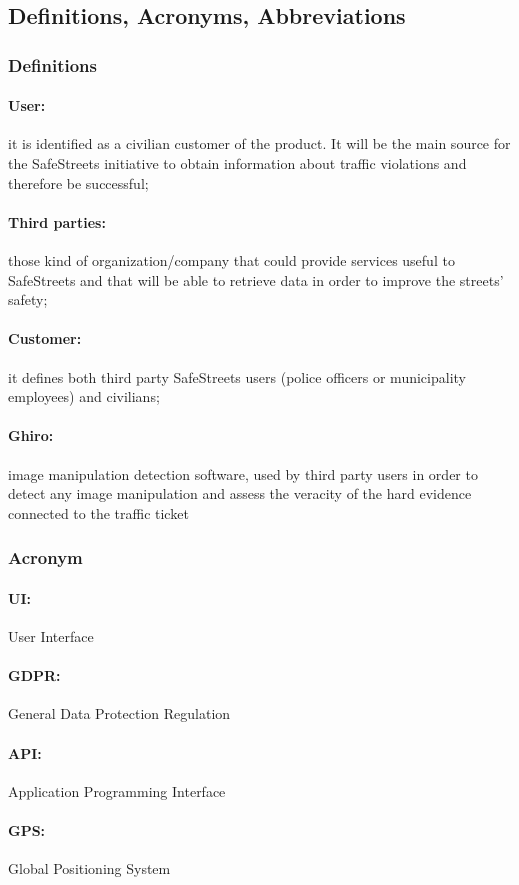 \documentclass{article}
\begin{document}
\subsection{Definitions, Acronyms, Abbreviations}
\subsubsection{Definitions}
\paragraph{User:} it is identified as a civilian customer of the product. It
will be the main source for the SafeStreets initiative to obtain information
about traffic violations and therefore be successful; \paragraph{Third
parties:}those kind of organization/company that could provide services useful
to SafeStreets and that will be able to retrieve data in order to improve the
streets' safety; \paragraph{Customer:} it defines both third party SafeStreets
users (police officers or municipality employees) and civilians;
\paragraph{Ghiro:} image manipulation detection software, used by third party
users in order to detect any image manipulation and assess the veracity of the
hard evidence connected to the traffic ticket
\subsubsection{Acronym}
\paragraph{UI:} User Interface \paragraph{GDPR:} General Data Protection
Regulation \paragraph{API:} Application Programming Interface \paragraph{GPS:}
Global Positioning System
\end{document}
